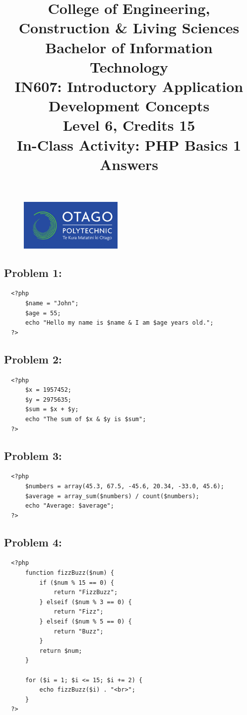 \documentclass{article}
\author{}
\begin{document}
\begin{figure}
    \centering
    \includegraphics[width=50mm]{../img/logo.png} 
\end{figure}

\title{College of Engineering, Construction \& Living Sciences\\Bachelor of Information Technology\\IN607: Introductory Application Development Concepts\\Level 6, Credits 15\\\textbf{In-Class Activity: PHP Basics 1 Answers}}
\date{}
\maketitle

\subsection*{Problem 1:} 
\begin{verbatim}
  <?php
      $name = "John";
      $age = 55;
      echo "Hello my name is $name & I am $age years old.";
  ?>
\end{verbatim}

\subsection*{Problem 2:} 
\begin{verbatim}
  <?php
      $x = 1957452;
      $y = 2975635;
      $sum = $x + $y;
      echo "The sum of $x & $y is $sum";
  ?>
\end{verbatim}

\subsection*{Problem 3:} 
\begin{verbatim}
  <?php
      $numbers = array(45.3, 67.5, -45.6, 20.34, -33.0, 45.6);
      $average = array_sum($numbers) / count($numbers);
      echo "Average: $average";
  ?>
\end{verbatim}

\subsection*{Problem 4:}
\begin{verbatim}
  <?php
      function fizzBuzz($num) {
          if ($num % 15 == 0) {
              return "FizzBuzz";
          } elseif ($num % 3 == 0) {
              return "Fizz";
          } elseif ($num % 5 == 0) {
              return "Buzz";
          }
          return $num;
      }

      for ($i = 1; $i <= 15; $i += 2) {
          echo fizzBuzz($i) . "<br>";
      }
  ?>
\end{verbatim}
\end{document}
